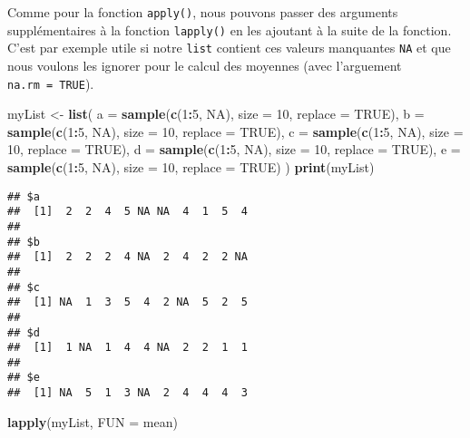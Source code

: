 \documentclass[]{book}
\newenvironment{Shaded}{\begin{snugshade}}{\end{snugshade}}
\newcommand{\KeywordTok}[1]{\textcolor[rgb]{0.13,0.29,0.53}{\textbf{#1}}}
\newcommand{\DataTypeTok}[1]{\textcolor[rgb]{0.13,0.29,0.53}{#1}}
\newcommand{\DecValTok}[1]{\textcolor[rgb]{0.00,0.00,0.81}{#1}}
\newcommand{\StringTok}[1]{\textcolor[rgb]{0.31,0.60,0.02}{#1}}
\newcommand{\OtherTok}[1]{\textcolor[rgb]{0.56,0.35,0.01}{#1}}
\newcommand{\OperatorTok}[1]{\textcolor[rgb]{0.81,0.36,0.00}{\textbf{#1}}}
\newcommand{\NormalTok}[1]{#1}
\theoremstyle{definition}
\theoremstyle{definition}
\theoremstyle{definition}
\theoremstyle{remark}
\begin{document}
Comme pour la fonction \texttt{apply()}, nous pouvons passer des
arguments supplémentaires à la fonction \texttt{lapply()} en les
ajoutant à la suite de la fonction. C'est par exemple utile si notre
\texttt{list} contient ces valeurs manquantes \texttt{NA} et que nous
voulons les ignorer pour le calcul des moyennes (avec l'arguement
\texttt{na.rm\ =\ TRUE}).

\begin{Shaded}
\begin{Highlighting}[]
\NormalTok{myList <-}\StringTok{ }\KeywordTok{list}\NormalTok{(}
  \DataTypeTok{a =} \KeywordTok{sample}\NormalTok{(}\KeywordTok{c}\NormalTok{(}\DecValTok{1}\OperatorTok{:}\DecValTok{5}\NormalTok{, }\OtherTok{NA}\NormalTok{), }\DataTypeTok{size =} \DecValTok{10}\NormalTok{, }\DataTypeTok{replace =} \OtherTok{TRUE}\NormalTok{), }
  \DataTypeTok{b =} \KeywordTok{sample}\NormalTok{(}\KeywordTok{c}\NormalTok{(}\DecValTok{1}\OperatorTok{:}\DecValTok{5}\NormalTok{, }\OtherTok{NA}\NormalTok{), }\DataTypeTok{size =} \DecValTok{10}\NormalTok{, }\DataTypeTok{replace =} \OtherTok{TRUE}\NormalTok{), }
  \DataTypeTok{c =} \KeywordTok{sample}\NormalTok{(}\KeywordTok{c}\NormalTok{(}\DecValTok{1}\OperatorTok{:}\DecValTok{5}\NormalTok{, }\OtherTok{NA}\NormalTok{), }\DataTypeTok{size =} \DecValTok{10}\NormalTok{, }\DataTypeTok{replace =} \OtherTok{TRUE}\NormalTok{), }
  \DataTypeTok{d =} \KeywordTok{sample}\NormalTok{(}\KeywordTok{c}\NormalTok{(}\DecValTok{1}\OperatorTok{:}\DecValTok{5}\NormalTok{, }\OtherTok{NA}\NormalTok{), }\DataTypeTok{size =} \DecValTok{10}\NormalTok{, }\DataTypeTok{replace =} \OtherTok{TRUE}\NormalTok{), }
  \DataTypeTok{e =} \KeywordTok{sample}\NormalTok{(}\KeywordTok{c}\NormalTok{(}\DecValTok{1}\OperatorTok{:}\DecValTok{5}\NormalTok{, }\OtherTok{NA}\NormalTok{), }\DataTypeTok{size =} \DecValTok{10}\NormalTok{, }\DataTypeTok{replace =} \OtherTok{TRUE}\NormalTok{)}
\NormalTok{)}
\KeywordTok{print}\NormalTok{(myList)}
\end{Highlighting}
\end{Shaded}

\begin{verbatim}
## $a
##  [1]  2  2  4  5 NA NA  4  1  5  4
## 
## $b
##  [1]  2  2  2  4 NA  2  4  2  2 NA
## 
## $c
##  [1] NA  1  3  5  4  2 NA  5  2  5
## 
## $d
##  [1]  1 NA  1  4  4 NA  2  2  1  1
## 
## $e
##  [1] NA  5  1  3 NA  2  4  4  4  3
\end{verbatim}

\begin{Shaded}
\begin{Highlighting}[]
\KeywordTok{lapply}\NormalTok{(myList, }\DataTypeTok{FUN =}\NormalTok{ mean)}
\end{Highlighting}
\end{Shaded}
\end{document}
